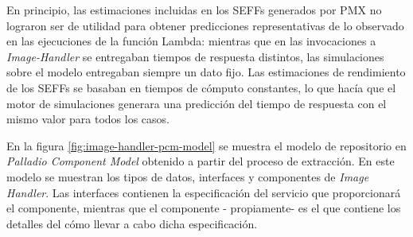 En principio, las estimaciones incluidas en los SEFFs generados por PMX no lograron ser de utilidad para obtener predicciones representativas de lo observado en las ejecuciones de la función Lambda: mientras que en las invocaciones a \emph{Image-Handler} se entregaban tiempos de respuesta distintos, las simulaciones sobre el modelo entregaban siempre un dato fijo. Las estimaciones de rendimiento de los SEFFs se basaban en tiempos de cómputo constantes, lo que hacía que el motor de simulaciones generara una predicción del tiempo de respuesta con el mismo valor para todos los casos.

En la figura \ref{fig:image-handler-pcm-model} se muestra el modelo de repositorio en \emph{Palladio Component Model} obtenido a partir del proceso de extracción. En este modelo se muestran los tipos de datos, interfaces y componentes de \emph{Image Handler}. Las interfaces contienen la especificación del servicio que proporcionará el componente, mientras que el componente - propiamente- es el que contiene los detalles del cómo llevar a cabo dicha especificación.






%    
%


